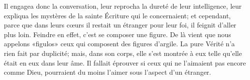 Il engagea donc la conversation,
	leur reprocha la dureté de leur intelligence,
	leur expliqua les mystères de la sainte Écriture qui le concernaient;
	et cependant,
		parce que dans leurs cœurs il restait un étranger pour leur foi,
	il feignit d’aller plus loin.
Feindre en effet, c’est se composer une figure.
	De là vient que nous appelons «figulos»
	ceux qui composent des figures d’argile.
La pure Vérité n’a rien fait par duplicité;
	mais, dans son corps, elle s’est montrée à eux
	telle qu’elle était en eux dans leur âme.
Il fallait éprouver si ceux qui ne l’aimaient pas encore comme Dieu,
	pourraient du moins l’aimer sous l’aspect d’un étranger.

